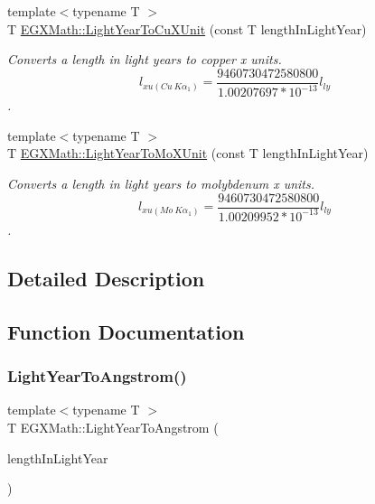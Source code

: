 \begin{DoxyCompactItemize}
{\footnotesize template$<$typename T $>$ }\\T \mbox{\hyperlink{group___e_g_x_math-_conversions-_length_conversions-_astronomical-_light_year-_non-_s_i_ga2a345996e344d547ea6db8b7e9174ae8}{E\+G\+X\+Math\+::\+Light\+Year\+To\+Cu\+X\+Unit}} (const T length\+In\+Light\+Year)
\begin{DoxyCompactList}\small\item\em Converts a length in light years to copper x units. \[ l_{xu(Cu\ K\alpha_1)}= \frac{9460730472580800}{1.00207697*10^{-13}} l_{ly}\]. \end{DoxyCompactList}\item 
{\footnotesize template$<$typename T $>$ }\\T \mbox{\hyperlink{group___e_g_x_math-_conversions-_length_conversions-_astronomical-_light_year-_non-_s_i_gac275191181b93d118ec2b21cf09ff356}{E\+G\+X\+Math\+::\+Light\+Year\+To\+Mo\+X\+Unit}} (const T length\+In\+Light\+Year)
\begin{DoxyCompactList}\small\item\em Converts a length in light years to molybdenum x units. \[ l_{xu(Mo\ K\alpha_1)}=\frac{9460730472580800}{1.00209952*10^{-13}} l_{ly}\]. \end{DoxyCompactList}\end{DoxyCompactItemize}


\subsection{Detailed Description}


\subsection{Function Documentation}
\mbox{\label{group___e_g_x_math-_conversions-_length_conversions-_astronomical-_light_year-_non-_s_i_ga09634a7c514e3a0f573e7c171a791f78}} 
\subsubsection{\texorpdfstring{Light\+Year\+To\+Angstrom()}{LightYearToAngstrom()}}
{\footnotesize\ttfamily template$<$typename T $>$ \\
T E\+G\+X\+Math\+::\+Light\+Year\+To\+Angstrom (\begin{DoxyParamCaption}\item[{const T}]{length\+In\+Light\+Year }\end{DoxyParamCaption})}




